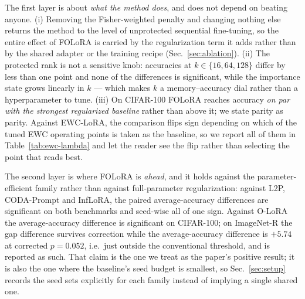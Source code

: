 The first layer is about \emph{what the method does}, and does not depend on beating
anyone. (i) Removing the Fisher-weighted penalty and changing nothing else returns the
method to the level of unprotected sequential fine-tuning, so the entire effect of FOLoRA
is carried by the regularization term it adds rather than by the shared adapter or the
training recipe (Sec.~\ref{sec:ablation}). (ii) The protected rank is not a sensitive
knob: accuracies at $k\in\{16,64,128\}$ differ by less than one point and none of the
differences is significant, while the importance state grows linearly in $k$ --- which
makes $k$ a memory--accuracy dial rather than a hyperparameter to tune. (iii) On CIFAR-100
FOLoRA reaches accuracy \emph{on par with the strongest regularized baseline} rather than
above it; we state parity as parity. Against EWC-LoRA, the comparison flips sign depending
on which of the tuned EWC operating points is taken as the baseline, so we report all of
them in Table~\ref{tab:ewc-lambda} and let the reader see the flip rather than selecting the
point that reads best.

The second layer is where FOLoRA is \emph{ahead}, and it holds against the parameter-efficient
family rather than against full-parameter regularization: against L2P, CODA-Prompt and
InfLoRA, the paired average-accuracy differences are significant on both benchmarks and
seed-wise all of one sign. Against O-LoRA the average-accuracy difference is significant on
CIFAR-100; on ImageNet-R the gap difference survives correction while the average-accuracy
difference is $+5.74$ at corrected $p=0.052$, i.e.\ just outside the conventional threshold,
and is reported as such. That claim is the one we treat as the paper's positive result;
it is also the one where the baseline's seed budget is smallest, so
Sec.~\ref{sec:setup} records the seed sets explicitly for each family instead of implying a
single shared one.

